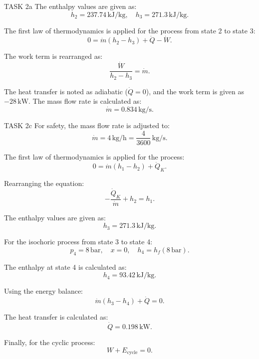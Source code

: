 TASK 2a  
The enthalpy values are given as:  
\[
h_2 = 237.74 \, \text{kJ/kg}, \quad h_3 = 271.3 \, \text{kJ/kg}.
\]  

The first law of thermodynamics is applied for the process from state 2 to state 3:  
\[
0 = \dot{m}(h_2 - h_3) + \dot{Q} - \dot{W}.
\]  

The work term is rearranged as:  
\[
\frac{\dot{W}}{h_2 - h_3} = \dot{m}.
\]  

The heat transfer is noted as adiabatic (\( \dot{Q} = 0 \)), and the work term is given as \( -28 \, \text{kW} \). The mass flow rate is calculated as:  
\[
\dot{m} = 0.834 \, \text{kg/s}.
\]  

TASK 2c  
For safety, the mass flow rate is adjusted to:  
\[
\dot{m} = 4 \, \text{kg/h} = \frac{4}{3600} \, \text{kg/s}.
\]  

The first law of thermodynamics is applied for the process:  
\[
0 = \dot{m}(h_1 - h_2) + \dot{Q}_K.
\]  

Rearranging the equation:  
\[
-\frac{\dot{Q}_K}{\dot{m}} + h_2 = h_1.
\]  

The enthalpy values are given as:  
\[
h_3 = 271.3 \, \text{kJ/kg}.
\]  

For the isochoric process from state 3 to state 4:  
\[
p_4 = 8 \, \text{bar}, \quad x = 0, \quad h_4 = h_f(8 \, \text{bar}).
\]  

The enthalpy at state 4 is calculated as:  
\[
h_4 = 93.42 \, \text{kJ/kg}.
\]  

Using the energy balance:  
\[
\dot{m}(h_3 - h_4) + \dot{Q} = 0.
\]  

The heat transfer is calculated as:  
\[
\dot{Q} = 0.198 \, \text{kW}.
\]  

Finally, for the cyclic process:  
\[
W + E_{\text{cycle}} = 0.
\]